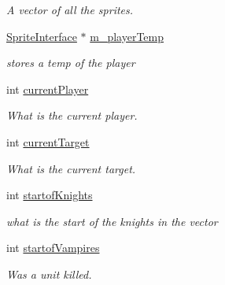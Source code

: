 \begin{DoxyCompactItemize}
\begin{DoxyCompactList}\small\item\em A vector of all the sprites. \end{DoxyCompactList}\item 
\mbox{\label{class_scene_a4f25002a15f8f1549f8337bc84ff83e4}} 
\mbox{\hyperlink{class_sprite_interface}{Sprite\+Interface}} $\ast$ \mbox{\hyperlink{class_scene_a4f25002a15f8f1549f8337bc84ff83e4}{m\+\_\+player\+Temp}}
\begin{DoxyCompactList}\small\item\em stores a temp of the player \end{DoxyCompactList}\item 
\mbox{\label{class_scene_abb000b09241752a5acc17bdcd3936c6e}} 
int \mbox{\hyperlink{class_scene_abb000b09241752a5acc17bdcd3936c6e}{current\+Player}}
\begin{DoxyCompactList}\small\item\em What is the current player. \end{DoxyCompactList}\item 
\mbox{\label{class_scene_a012fe2d4370deb5bdac43bd5e607ca42}} 
int \mbox{\hyperlink{class_scene_a012fe2d4370deb5bdac43bd5e607ca42}{current\+Target}}
\begin{DoxyCompactList}\small\item\em What is the current target. \end{DoxyCompactList}\item 
\mbox{\label{class_scene_a3c8813c62033911d9a602a49a8beca76}} 
int \mbox{\hyperlink{class_scene_a3c8813c62033911d9a602a49a8beca76}{startof\+Knights}}
\begin{DoxyCompactList}\small\item\em what is the start of the knights in the vector \end{DoxyCompactList}\item 
\mbox{\label{class_scene_a903aebbd9a63f70dbb9df52a253e83ce}} 
int \mbox{\hyperlink{class_scene_a903aebbd9a63f70dbb9df52a253e83ce}{startof\+Vampires}}
\begin{DoxyCompactList}\small\item\em Was a unit killed. \end{DoxyCompactList}\item 

\end{DoxyCompactItemize}
